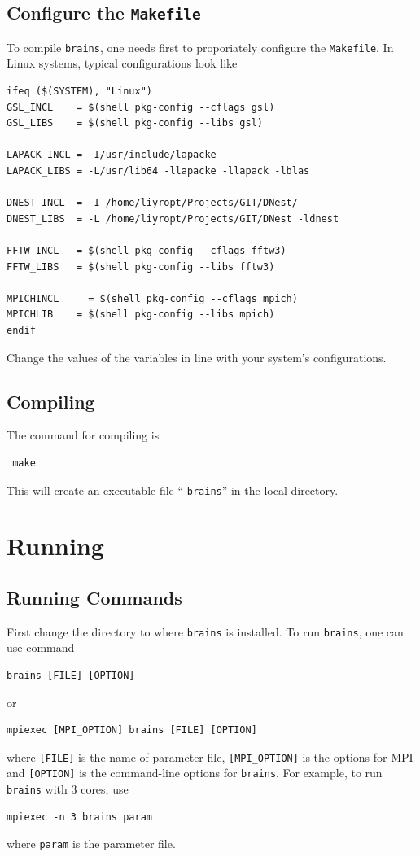 \documentclass[oneside]{book}
\def\brains{{\texttt{brains}}}
\begin{document}
\section{Configure the \texttt{Makefile}}
To compile {\brains}, one needs first to proporiately configure the \texttt{Makefile}. In Linux systems, typical configurations look like
\begin{shaded}
\scriptsize
\begin{verbatim}
ifeq ($(SYSTEM), "Linux")
GSL_INCL    = $(shell pkg-config --cflags gsl)
GSL_LIBS    = $(shell pkg-config --libs gsl) 

LAPACK_INCL = -I/usr/include/lapacke
LAPACK_LIBS = -L/usr/lib64 -llapacke -llapack -lblas

DNEST_INCL  = -I /home/liyropt/Projects/GIT/DNest/
DNEST_LIBS  = -L /home/liyropt/Projects/GIT/DNest -ldnest

FFTW_INCL   = $(shell pkg-config --cflags fftw3) 
FFTW_LIBS   = $(shell pkg-config --libs fftw3) 

MPICHINCL     = $(shell pkg-config --cflags mpich) 
MPICHLIB    = $(shell pkg-config --libs mpich) 
endif
\end{verbatim}
\end{shaded}
Change the values of the variables in line with your system's configurations.

\section{Compiling}
The command for compiling is 
\begin{verbatim}
 make
\end{verbatim}
This will create an executable file `` \texttt{brains}'' in the local directory.


\chapter{Running}

\section{Running Commands}
First change the directory to where \texttt{brains} is installed. To run \texttt{brains}, one can use command
\begin{verbatim}
brains [FILE] [OPTION]
\end{verbatim}
or
\begin{verbatim}
mpiexec [MPI_OPTION] brains [FILE] [OPTION]
\end{verbatim}
where \texttt{[FILE]} is the name of parameter file, \texttt{[MPI\_OPTION]} is the options for MPI and \texttt{[OPTION]}
is the command-line options for \texttt{brains}. For example, to run \texttt{brains} with 3 cores, use
\begin{verbatim}
mpiexec -n 3 brains param
\end{verbatim}
where \texttt{param} is the parameter file. 
\end{document}
